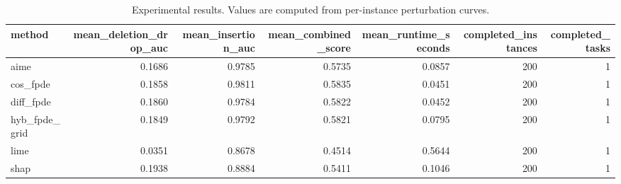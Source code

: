 \begin{table}[t]
\caption{Experimental results. Values are computed from per-instance perturbation curves.}
\label{tab:main_results_computed}
\centering
\begin{tabular}{lrrrrrr}
\toprule
method & mean\_deletion\_drop\_auc & mean\_insertion\_auc & mean\_combined\_score & mean\_runtime\_seconds & completed\_instances & completed\_tasks \\
\midrule
aime & 0.1686 & 0.9785 & 0.5735 & 0.0857 & 200 & 1 \\
cos\_fpde & 0.1858 & 0.9811 & 0.5835 & 0.0451 & 200 & 1 \\
diff\_fpde & 0.1860 & 0.9784 & 0.5822 & 0.0452 & 200 & 1 \\
hyb\_fpde\_grid & 0.1849 & 0.9792 & 0.5821 & 0.0795 & 200 & 1 \\
lime & 0.0351 & 0.8678 & 0.4514 & 0.5644 & 200 & 1 \\
shap & 0.1938 & 0.8884 & 0.5411 & 0.1046 & 200 & 1 \\
\bottomrule
\end{tabular}

\end{table}
